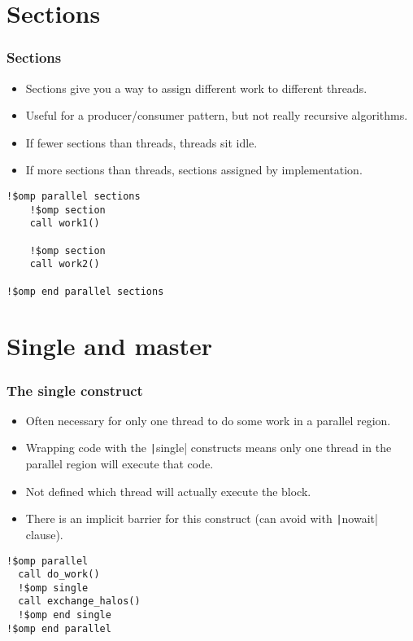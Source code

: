 \documentclass{beamer}
\begin{document}
\section{Sections}
\begin{frame}[fragile]
\frametitle{Sections}
\begin{itemize}
  \item Sections give you a way to assign different work to different threads.
  \item Useful for a producer/consumer pattern, but not really recursive algorithms.
  \item If fewer sections than threads, threads sit idle.
  \item If more sections than threads, sections assigned by implementation.
\end{itemize}

\begin{verbatim}
!$omp parallel sections
    !$omp section
    call work1()

    !$omp section
    call work2()

!$omp end parallel sections
\end{verbatim}
\end{frame}

\section{Single and master}
\begin{frame}[fragile]
\frametitle{The single construct}
\begin{itemize}
  \item Often necessary for only one thread to do some work in a parallel region.
  \item Wrapping code with the \texttt|single| constructs means only one thread in the parallel region will execute that code.
  \item Not defined which thread will actually execute the block.
  \item There is an implicit barrier for this construct (can avoid with \texttt|nowait| clause).
\end{itemize}

\begin{verbatim}
!$omp parallel
  call do_work()
  !$omp single
  call exchange_halos()
  !$omp end single
!$omp end parallel
\end{verbatim}
\end{frame}
\end{document}
